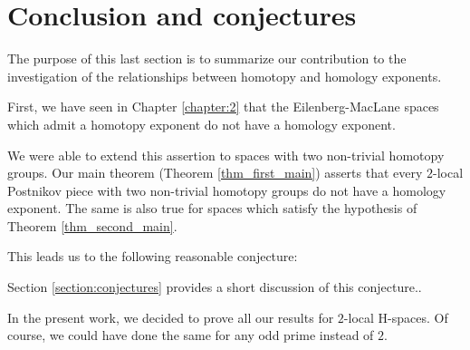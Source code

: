 \section{Conclusion and conjectures}

The purpose of this last section is to summarize our contribution to the investigation of the relationships between homotopy and homology exponents. 

\medskip
First, we have seen in Chapter \ref{chapter:2} that the Eilenberg-MacLane spaces which admit a homotopy exponent do not have a homology exponent. 

\medskip
We were able to extend this assertion to spaces with two non-trivial homotopy groups. Our main theorem (Theorem \ref{thm_first_main}) asserts that every $2$-local Postnikov piece with two non-trivial homotopy groups do not have a homology exponent. The same is also true for spaces which satisfy the hypothesis of Theorem \ref{thm_second_main}. 

\medskip
This leads us to the following reasonable conjecture: 

\begin{conj_main}

\end{conj_main}

Section \ref{section:conjectures} provides a short discussion of this conjecture..

\begin{rem*}
In the present work, we decided to prove all our results for $2$-local H-spaces. Of course, we could have done the same for any odd prime instead of $2$.
\end{rem*}

\endinput